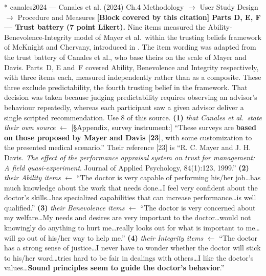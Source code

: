 \documentclass[11pt, a4paper]{article}
\makeatletter
\newcounter{citentry}
\newcommand{\citentry@core}[7]{%
  \stepcounter{citentry}
  \begingroup
  \sbox{\citentry@measurebox}{%
    \begin{minipage}{\linewidth}
      \noindent\colorbox{konstanzblue}{\parbox{\dimexpr\linewidth-2\fboxsep}{%
        \vspace{3pt}
        \textbf{\#\thecitentry \quad #2} \hfill \textit{#3}
        \vspace{3pt}
      }}
      \vspace{3pt}
      \noindent\begin{tabular}{@{}p{2.7cm} p{\dimexpr\linewidth-3cm}@{}}
        \textit{\small Sentence in thesis:} & #4 \\[5pt]
        \textbf{Usage:}\hfill       & #5 \\[5pt]
        \textit{\small Original source:}     & #6 \\[5pt]
        \textbf{How to check:}             & #7 \\
      \end{tabular}
      \vspace{5pt}
      \rule{10pt}{10pt}\quad \textbf{Validated} --- I have read the original and agree it supports the sentence.
    \end{minipage}%
  }%
  \Needspace{\dimexpr\ht\citentry@measurebox+\dp\citentry@measurebox\relax}%
  \endgroup
  \vspace{10pt}
  \noindent\colorbox{konstanzblue}{\parbox{\dimexpr\linewidth-2\fboxsep}{%
    \vspace{3pt}
    \textcolor{white}{\textbf{\#\thecitentry \quad #2}} \hfill \textcolor{white}{\textit{#3}}
    \vspace{3pt}
  }}
  \vspace{3pt}
  \noindent\begin{tabular}{@{}p{2.7cm} p{\dimexpr\linewidth-3cm}@{}}
    \textit{\small Sentence in thesis:} & \textcolor{darkgreen}{#4} \\[5pt]
    \textbf{Usage:}\hfill       & #5 \\[5pt]
    \textit{\small Original source:}     & \textcolor{darkred}{#6} \\[5pt]
    \textbf{How to check:}             & #7 \\
  \end{tabular}
  \vspace{5pt}
  \noindent\CheckBox[name=verified\thecitentry, width=10pt, height=10pt, bordercolor={0 0 0}, borderwidth=0.75, backgroundcolor={1 1 1}#1]{}\quad \textbf{Validated} --- I have read the original and agree it supports the sentence.
  \vspace{3pt}
  \noindent\textcolor{midgray}{\rule{\linewidth}{0.4pt}}
}
\newcommand{\citentry}{\@ifstar{\citentry@core{, checked}}{\citentry@core{}}}
\makeatother
\begin{document}
\begin{Form}
\citentry*
  {canales2024 --- Canales et al. (2024)}
  {Ch.4 Methodology $\rightarrow$ User Study Design $\rightarrow$ Procedure and Measures}
  {\textbf{[Block covered by this citation]} \textbf{Parts D, E, F — Trust battery (7 point Likert).} Nine items measured the Ability-Benevolence-Integrity model of Mayer et al.\ within the trusting beliefs framework of McKnight and Chervany, introduced in . The item wording was adapted from the trust battery of Canales et al., who base theirs on the scale of Mayer and Davis. Parts~D, E and~F covered Ability, Benevolence and Integrity respectively, with three items each, measured independently rather than as a composite. These three exclude predictability, the fourth trusting belief in the framework. That decision was taken because judging predictability requires observing an advisor's behaviour repeatedly, whereas each participant saw a given advisor deliver a single scripted recommendation.}
  {Use 8 of this source.}
  {\textbf{(1)} \emph{that Canales et al.\ state their own source} $\leftarrow$ [\S Appendix, survey instrument:] ``These surveys are \textbf{based on those proposed by Mayer and Davis [23]}, with some customization to the presented medical scenario.'' Their reference [23] is ``R. C. Mayer and J. H. Davis. \emph{The effect of the performance appraisal system on trust for management: A field quasi-experiment}. Journal of Applied Psychology, 84(1):123, 1999.'' \quad \textbf{(2)} \emph{their Ability items} $\leftarrow$ ``The doctor is very capable of performing his/her job\ldots has much knowledge about the work that needs done\ldots I feel very confident about the doctor's skills\ldots has specialized capabilities that can increase performance\ldots is well qualified.'' \quad \textbf{(3)} \emph{their Benevolence items} $\leftarrow$ ``The doctor is very concerned about my welfare\ldots My needs and desires are very important to the doctor\ldots would not knowingly do anything to hurt me\ldots really looks out for what is important to me\ldots will go out of his/her way to help me.'' \quad \textbf{(4)} \emph{their Integrity items} $\leftarrow$ ``The doctor has a strong sense of justice\ldots I never have to wonder whether the doctor will stick to his/her word\ldots tries hard to be fair in dealings with others\ldots I like the doctor's values\ldots \textbf{Sound principles seem to guide the doctor's behavior}.''}

\end{Form}
\end{document}
